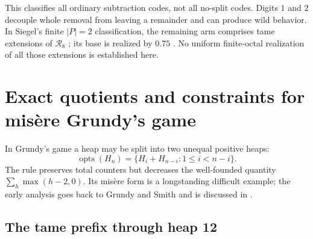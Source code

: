 \documentclass[11pt]{article}
\theoremstyle{definition}
\theoremstyle{remark}
\newcommand{\opts}{\operatorname{opts}}
\begin{document}
This classifies all ordinary subtraction codes, not all no-split codes.
Digits $1$ and $2$ decouple whole removal from leaving a remainder and can
produce wild behavior.  In Siegel's finite $|P|=2$ classification, the
remaining arm comprises tame extensions of $\mathcal R_8$
\cite{siegel2007}; its base is realized by $0.75$
\cite{plambecksiegel2008}.  No uniform finite-octal realization of all
those extensions is established here.

\section{Exact quotients and constraints for mis\`ere Grundy's game}\label{sec:grundy}

In Grundy's game a heap may be split into two unequal positive heaps:
\[
 \opts(H_n)=\{H_i+H_{n-i}:1\le i<n-i\}.
\]
The rule preserves total counters but decreases the well-founded quantity
$\sum_h\max(h-2,0)$.  Its mis\`ere form is a longstanding difficult example;
the early analysis goes back to Grundy and Smith \cite{grundysmith1956} and
is discussed in \cite{berlekampconwayguy2001}.

\subsection{The tame prefix through heap 12}
\end{document}
